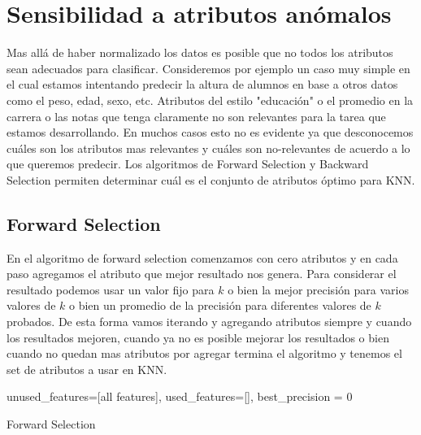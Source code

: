 \section{Sensibilidad a atributos anómalos}

Mas allá de haber normalizado los datos es posible que no todos los atributos sean adecuados para clasificar. Consideremos por ejemplo un caso muy simple en el cual estamos intentando predecir la altura de alumnos en base a otros datos como el peso, edad, sexo, etc. Atributos del estilo "educación" o el promedio en la carrera o las notas que tenga claramente no son relevantes para la tarea que estamos desarrollando. En muchos casos esto no es evidente ya que desconocemos cuáles son los atributos mas relevantes y cuáles son no-relevantes de acuerdo a lo que queremos predecir. Los algoritmos de Forward Selection y Backward Selection permiten determinar cuál es el conjunto de atributos óptimo para KNN.

\subsection{Forward Selection}

En el algoritmo de forward selection comenzamos con cero atributos y en cada paso agregamos el atributo que mejor resultado nos genera. Para considerar el resultado podemos usar un valor fijo para $k$ o bien la mejor precisión para varios valores de $k$ o bien un promedio de la precisión para diferentes valores de $k$ probados.
De esta forma vamos iterando y agregando atributos siempre y cuando los resultados mejoren, cuando ya no es posible mejorar los resultados o bien cuando no quedan mas atributos por agregar termina el algoritmo y tenemos el set de atributos a usar en KNN. 

\begin{algorithm}[]
unused\_features=[all features], used\_features=[], best\_precision = 0\;
 \caption{Forward Selection}
\end{algorithm}

